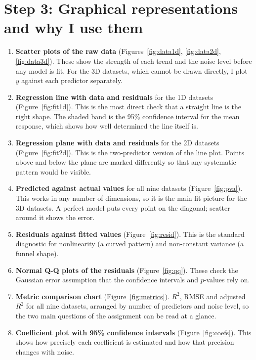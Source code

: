 \documentclass[11pt]{article}
\begin{document}
\section{Step 3: Graphical representations and why I use them}

\begin{enumerate}[leftmargin=1.6em]
\item \textbf{Scatter plots of the raw data} (Figures~\ref{fig:data1d}, \ref{fig:data2d}, \ref{fig:data3d}). These show the strength of each trend and the noise level before any model is fit. For the 3D datasets, which cannot be drawn directly, I plot $y$ against each predictor separately.
\item \textbf{Regression line with data and residuals} for the 1D datasets (Figure~\ref{fig:fit1d}). This is the most direct check that a straight line is the right shape. The shaded band is the 95\% confidence interval for the mean response, which shows how well determined the line itself is.
\item \textbf{Regression plane with data and residuals} for the 2D datasets (Figure~\ref{fig:fit2d}). This is the two-predictor version of the line plot. Points above and below the plane are marked differently so that any systematic pattern would be visible.
\item \textbf{Predicted against actual values} for all nine datasets (Figure~\ref{fig:pva}). This works in any number of dimensions, so it is the main fit picture for the 3D datasets. A perfect model puts every point on the diagonal; scatter around it shows the error.
\item \textbf{Residuals against fitted values} (Figure~\ref{fig:resid}). This is the standard diagnostic for nonlinearity (a curved pattern) and non-constant variance (a funnel shape).
\item \textbf{Normal Q-Q plots of the residuals} (Figure~\ref{fig:qq}). These check the Gaussian error assumption that the confidence intervals and $p$-values rely on.
\item \textbf{Metric comparison chart} (Figure~\ref{fig:metrics}). $R^2$, RMSE and adjusted $R^2$ for all nine datasets, arranged by number of predictors and noise level, so the two main questions of the assignment can be read at a glance.
\item \textbf{Coefficient plot with 95\% confidence intervals} (Figure~\ref{fig:coefs}). This shows how precisely each coefficient is estimated and how that precision changes with noise.
\end{enumerate}
\end{document}
